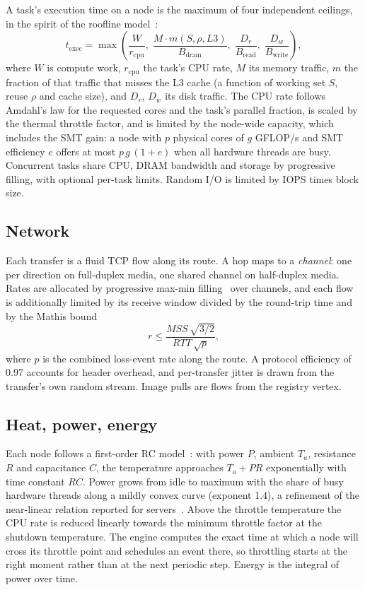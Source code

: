 \documentclass[12pt,a4paper]{report}
\begin{document}
A task's execution time on a node is the maximum of four independent
ceilings, in the spirit of the roofline model~\cite{williams2009roofline}:
\begin{equation}
t_{\mathrm{exec}} = \max\left(
\frac{W}{r_{\mathrm{cpu}}},\;
\frac{M \cdot m(S, \rho, L3)}{B_{\mathrm{dram}}},\;
\frac{D_r}{B_{\mathrm{read}}},\;
\frac{D_w}{B_{\mathrm{write}}}\right),
\end{equation}
where $W$ is compute work, $r_{\mathrm{cpu}}$ the task's CPU rate, $M$ its
memory traffic, $m$ the fraction of that traffic that misses the L3 cache
(a function of working set $S$, reuse $\rho$ and cache size), and $D_r$,
$D_w$ its disk traffic. The CPU rate follows Amdahl's law for the
requested cores and the task's parallel fraction, is scaled by the thermal
throttle factor, and is limited by the node-wide capacity, which includes
the SMT gain: a node with $p$ physical cores of $g$ GFLOP/s and SMT
efficiency $e$ offers at most $p\,g\,(1+e)$ when all hardware threads are
busy. Concurrent tasks share CPU, DRAM bandwidth and storage by
progressive filling, with optional per-task limits. Random I/O is limited
by IOPS times block size.

\subsection{Network}

Each transfer is a fluid TCP flow along its route. A hop maps to a
\emph{channel}: one per direction on full-duplex media, one shared channel
on half-duplex media. Rates are allocated by progressive max-min
filling~\cite{bertsekas1992data} over channels, and each flow is
additionally limited by its receive window divided by the round-trip time
and by the Mathis bound~\cite{mathis1997tcp}
\begin{equation}
r \le \frac{\mathit{MSS}\,\sqrt{3/2}}{\mathit{RTT}\,\sqrt{p}},
\end{equation}
where $p$ is the combined loss-event rate along the route. A protocol
efficiency of 0.97 accounts for header overhead, and per-transfer jitter
is drawn from the transfer's own random stream. Image pulls are flows
from the registry vertex.

\subsection{Heat, power, energy}

Each node follows a first-order RC model~\cite{skadron2003temperature}:
with power $P$, ambient $T_a$, resistance $R$ and capacitance $C$, the
temperature approaches $T_a + P R$ exponentially with time constant
$RC$. Power grows from idle to maximum with the share of busy hardware
threads along a mildly convex curve (exponent 1.4), a refinement of the
near-linear relation reported for servers~\cite{fan2007power}. Above the
throttle temperature the CPU rate is
reduced linearly towards the minimum throttle factor at the shutdown
temperature. The engine computes the exact time at which a node will cross
its throttle point and schedules an event there, so throttling starts at
the right moment rather than at the next periodic step. Energy is the
integral of power over time.
\end{document}
